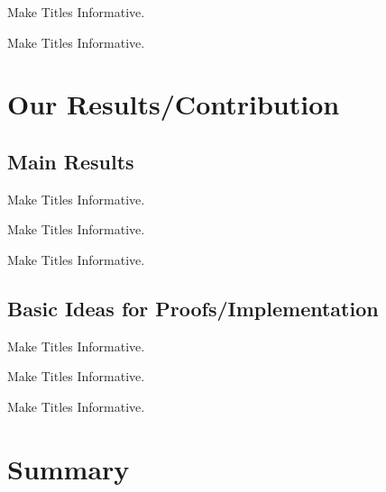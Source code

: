 \documentclass[aspectratio=169]{beamer}
\newcommand{\1}{\mathbf{1}}
\newcommand{\0}{\mathbf{0}}
\begin{document}
\begin{frame}{Make Titles Informative.}
\end{frame}

\begin{frame}{Make Titles Informative.}
\end{frame}



\section{Our Results/Contribution}

\subsection{Main Results}

\begin{frame}{Make Titles Informative.}
\end{frame}

\begin{frame}{Make Titles Informative.}
\end{frame}

\begin{frame}{Make Titles Informative.}
\end{frame}


\subsection{Basic Ideas for Proofs/Implementation}

\begin{frame}{Make Titles Informative.}
\end{frame}

\begin{frame}{Make Titles Informative.}
\end{frame}

\begin{frame}{Make Titles Informative.}
\end{frame}



\section*{Summary}
\end{document}
